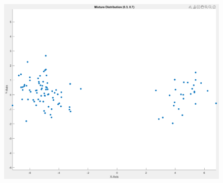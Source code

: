 \documentclass[a4paper]{article}
\theoremstyle{definition}
\newenvironment{soln}{
	\leavevmode\color{blue}\ignorespaces
}{}
\begin{document}
\begin{enumerate}
        
  
		\begin{soln}
		\begin{figure}[h!]
		    \centering
		    \includegraphics[width=1\textwidth]{images/7_2.png}  
		    \captionsetup{labelformat=empty}
		    \caption{}
		    \label{fig:mixed}
		\end{figure}
	\end{soln}
	\end{enumerate}
	
	
	
	
	
	
	
\end{document}
